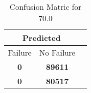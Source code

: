 \begin{table}[] 
\caption{Confusion Matric for 70.0} 
\label{Table: Prediction Accuracy-DMD70.0OnlySunEKF-ignoreReflection500.9EKF-top2-Reflection} 
\centering 
\begin{tabular} 
 {@{}ccc@{}} 
\toprule 
\multicolumn{2}{c}{\textbf{Predicted}}
 \\ \midrule 
\multicolumn{1}{|c|}{Failure} & 
\multicolumn{1}{c|}{No Failure}
 \\ \midrule 
\multicolumn{1}{|c|}{\color{green}\textbf{0}} & 
\multicolumn{1}{c|}{\color{green}\textbf{89611}}
 \\ \midrule 
\multicolumn{1}{|c|}{\color{green}\textbf{0}} & 
\multicolumn{1}{c|}{\color{red}\textbf{80517}}
 \\ \bottomrule 
\end{tabular} 
\end{table} 
